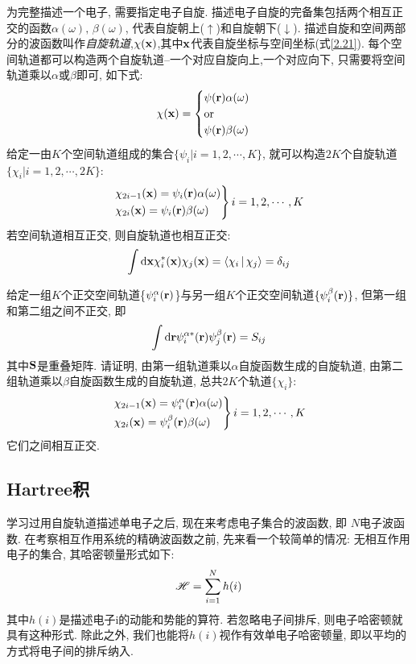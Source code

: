 为完整描述一个电子, 需要指定电子自旋. 描述电子自旋的完备集包括两个相互正交的函数$\alpha(\omega),\,\beta(\omega)$, 代表自旋朝上($\uparrow$)和自旋朝下($\downarrow$). 描述自旋和空间两部分的波函数叫作\emph{自旋轨道},$\chi(\mathbf{x})$,其中$\mathbf{x}$代表自旋坐标与空间坐标(式\ref{2.21}). 每个空间轨道都可以构造两个自旋轨道--一个对应自旋向上,一个对应向下, 只需要将空间轨道乘以$\alpha$或$\beta$即可, 如下式:
\begin{equation}
	\chi(\mathbf{x})=
	\begin{cases}
	\psi(\mathbf{r})\alpha(\omega)\\
	\text{or}\\
	\psi(\mathbf{r})\beta(\omega)
	\end{cases}
\end{equation}
给定一由$K$个空间轨道组成的集合$\{\psi_i|i=1,2,\cdots,K \}$, 就可以构造$2K$个自旋轨道$\{\chi_i|i=1,2,\cdots, 2K\}$:
\begin{equation}
\begin{rcases}
	\chi_{2i-1}(\mathbf{x})=\psi_i(\mathbf{r})\alpha(\omega)\\
	\chi_{2i}(\mathbf{x})=\psi_i(\mathbf{r})\beta(\omega)
\end{rcases}
i=1,2,\cdots,K
\end{equation}
若空间轨道相互正交, 则自旋轨道也相互正交:
\begin{equation}
\int\dd\bo{x}\chi_i^*(\bo{x})\chi_j(\bo{x})=\braket{\chi_i|\chi_j}=\delta_{ij}
\end{equation}
\begin{xercise}
给定一组$K$个正交空间轨道\{$\psi_i^\alpha(\mathbf{r})$\}与另一组$K$个正交空间轨道$\{\psi_i^\beta(\mathbf{r})\}$, 但第一组和第二组之间不正交, 即
\[
\int\dd\bo{r}\psi_i^{\alpha*}(\bo{r})\psi_j^\beta(\bo{r})=S_{ij}
\]
其中$\mathbf{S}$是重叠矩阵. 请证明, 由第一组轨道乘以$\alpha$自旋函数生成的自旋轨道, 由第二组轨道乘以$\beta$自旋函数生成的自旋轨道, 总共$2K$个轨道$\{\chi_i \}$:
\begin{equation*}
\begin{rcases}
\chi_{2i-1}(\mathbf{x})=\psi_i^\alpha(\mathbf{r})\alpha(\omega)\\
\chi_{2i}(\mathbf{x})=\psi_i^\beta(\mathbf{r})\beta(\omega)
\end{rcases}
i=1,2,\cdots,K
\end{equation*}
它们之间相互正交.
\end{xercise}
\subsection{Hartree积}
 \label{sec2.2.2}
学习过用自旋轨道描述单电子之后, 现在来考虑电子集合的波函数, 即 $N$电子波函数. 在考察相互作用系统的精确波函数之前, 先来看一个较简单的情况: 无相互作用电子的集合, 其哈密顿量形式如下:
\begin{equation}
\label{2.28}
\mathscr{H}=\sum_{i=1}^{N}h(i)
\end{equation}
其中$h(i)$是描述电子i的动能和势能的算符. 若忽略电子间排斥, 则电子哈密顿就具有这种形式. 除此之外, 我们也能将$h(i)$视作有效单电子哈密顿量, 即以平均的方式将电子间的排斥纳入.


